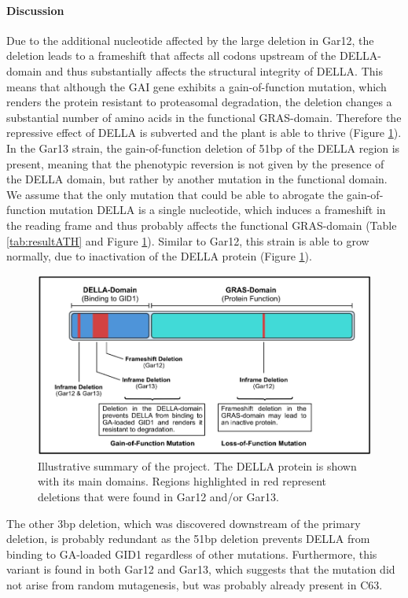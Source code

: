 \documentclass[10pt,a4paper]{article}
\begin{document}
\paragraph{Discussion}

Due to the additional nucleotide affected by the large deletion in Gar12, the deletion leads to a frameshift that affects all codons upstream of the DELLA-domain and thus substantially affects the structural integrity of DELLA. This means that although the GAI gene exhibits a gain-of-function mutation, which renders the protein resistant to proteasomal degradation, the deletion changes a substantial number of amino acids in the functional GRAS-domain. Therefore the repressive effect of DELLA is subverted and the plant is able to thrive (Figure \ref{fig:delladomains}).\\


In the Gar13 strain, the gain-of-function deletion of 51bp of the DELLA region is present, meaning that the phenotypic reversion is not given by the presence of the DELLA domain, but rather by another mutation in the functional domain. We assume that the only mutation that could be able to abrogate the gain-of-function mutation DELLA is a single nucleotide, which induces a frameshift in the reading frame and thus probably affects the functional GRAS-domain (Table \ref{tab:resultATH} and Figure \ref{fig:delladomains}). Similar to Gar12, this strain is able to grow normally, due to inactivation of the DELLA protein (Figure \ref{fig:delladomains}).


\begin{figure}
	\centering
	\includegraphics[width=0.7\linewidth]{img/DELLAdomains}
	\caption{Illustrative summary of the project. The DELLA protein is shown with its main domains. Regions highlighted in red represent deletions that were found in Gar12 and/or Gar13.}
	\label{fig:delladomains}
\end{figure}



The other 3bp deletion, which was discovered downstream of the primary deletion, is probably redundant as the 51bp deletion prevents DELLA from binding to GA-loaded GID1 regardless of other mutations. Furthermore, this variant is found in both Gar12 and Gar13, which suggests that the mutation did not arise from random mutagenesis, but was probably already present in C63.\\
\end{document}
